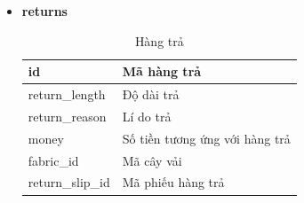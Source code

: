 \begin{itemize}
    \item \textbf{returns}
    \begin{table}[H]
        \centering
        \begin{tabular}{|m{3cm}|m{10cm}|}
        \hline 
            id & Mã hàng trả\\ \hline
            return\_length & Độ dài trả\\ \hline
            return\_reason & Lí do trả \\ \hline
            money & Số tiền tương ứng với hàng trả\\ \hline
            fabric\_id & Mã cây vải\\ \hline
            return\_slip\_id & Mã phiếu hàng trả\\ 
        \hline 
        \end{tabular}
        \caption{Hàng trả}
        \label{returns}
    \end{table}


\end{itemize}


\newpage